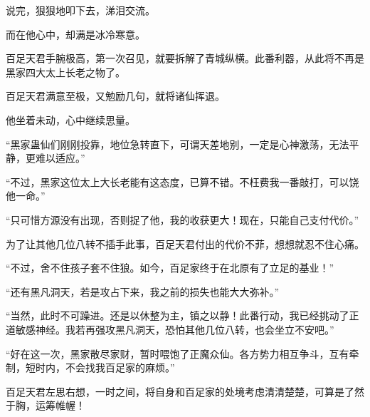 \begin{this_body}
说完，狠狠地叩下去，涕泪交流。

而在他心中，却满是冰冷寒意。

百足天君手腕极高，第一次召见，就要拆解了青城纵横。此番利器，从此将不再是黑家四大太上长老之物了。

百足天君满意至极，又勉励几句，就将诸仙挥退。

他坐着未动，心中继续思量。

“黑家蛊仙们刚刚投靠，地位急转直下，可谓天差地别，一定是心神激荡，无法平静，更难以适应。”

“不过，黑家这位太上大长老能有这态度，已算不错。不枉费我一番敲打，可以饶他一命。”

“只可惜方源没有出现，否则捉了他，我的收获更大！现在，只能自己支付代价。”

为了让其他几位八转不插手此事，百足天君付出的代价不菲，想想就忍不住心痛。

“不过，舍不住孩子套不住狼。如今，百足家终于在北原有了立足的基业！”

“还有黑凡洞天，若是攻占下来，我之前的损失也能大大弥补。”

“当然，此时不可躁进。还是以休整为主，镇之以静！此番行动，我已经挑动了正道敏感神经。我若再强攻黑凡洞天，恐怕其他几位八转，也会坐立不安吧。”

“好在这一次，黑家散尽家财，暂时喂饱了正魔众仙。各方势力相互争斗，互有牵制，短时内，不会找我百足家的麻烦。”

百足天君左思右想，一时之间，将自身和百足家的处境考虑清清楚楚，可算是了然于胸，运筹帷幄！

\end{this_body}

